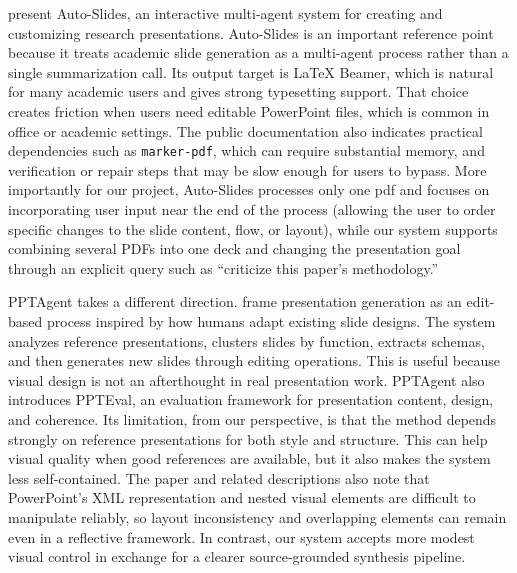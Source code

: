 \documentclass[11pt]{article}
\begin{document}
\citet{autoslides2025} present Auto-Slides, an interactive multi-agent system for creating and customizing research presentations. Auto-Slides is an important reference point because it treats academic slide generation as a multi-agent process rather than a single summarization call. Its output target is LaTeX Beamer, which is natural for many academic users and gives strong typesetting support. That choice creates friction when users need editable PowerPoint files, which is common in office or academic settings. The public documentation also indicates practical dependencies such as \texttt{marker-pdf}, which can require substantial memory, and verification or repair steps that may be slow enough for users to bypass. More importantly for our project, Auto-Slides processes only one pdf and focuses on incorporating user input near the end of the process (allowing the user to order specific changes to the slide content, flow, or layout), while our system supports combining several PDFs into one deck and changing the presentation goal through an explicit query such as ``criticize this paper's methodology.''

PPTAgent takes a different direction. \citet{zheng2025pptagent} frame presentation generation as an edit-based process inspired by how humans adapt existing slide designs. The system analyzes reference presentations, clusters slides by function, extracts schemas, and then generates new slides through editing operations. This is useful because visual design is not an afterthought in real presentation work. PPTAgent also introduces PPTEval, an evaluation framework for presentation content, design, and coherence. Its limitation, from our perspective, is that the method depends strongly on reference presentations for both style and structure. This can help visual quality when good references are available, but it also makes the system less self-contained. The paper and related descriptions also note that PowerPoint's XML representation and nested visual elements are difficult to manipulate reliably, so layout inconsistency and overlapping elements can remain even in a reflective framework. In contrast, our system accepts more modest visual control in exchange for a clearer source-grounded synthesis pipeline.
\end{document}
